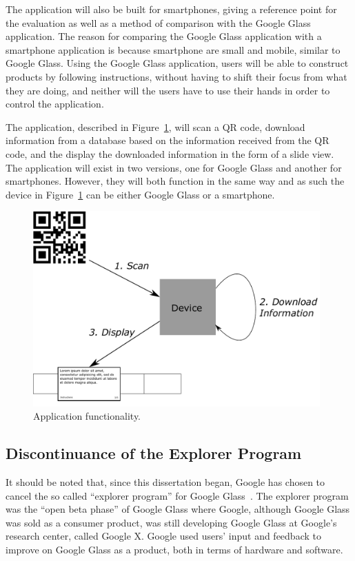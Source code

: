 The application will also be built for smartphones, giving a reference point for the evaluation as well as a method of comparison with the Google Glass application. The reason for comparing the Google Glass application with a smartphone application is because smartphone are small and mobile, similar to Google Glass. Using the Google Glass application, users will be able to construct products by following instructions, without having to shift their focus from what they are doing, and neither will the users have to use their hands in order to control the application.

The application, described in Figure~\ref{projectmapLightVersion}, will scan a QR code, download information from a database based on the information received from the QR code, and the display the downloaded information in the form of a slide view. The application will exist in two versions, one for Google Glass and another for smartphones. However, they will both function in the same way and as such the device in Figure~\ref{projectmapLightVersion} can be either Google Glass or a smartphone.

	\begin{figure}[ht!]
		\centering
		\includegraphics[width=110mm]{images/projectmapLightVersion}
		\caption{Application functionality.}
		\label{projectmapLightVersion}
	\end{figure}

\subsection{Discontinuance of the Explorer Program}
It should be noted that, since this dissertation began, Google has chosen to cancel the so called ``explorer program'' for Google Glass~\cite{glassDiscontinued}. The explorer program was the ``open beta phase'' of Google Glass where Google, although Google Glass was sold as a consumer product, was still developing Google Glass at Google's research center, called Google X. Google used users' input and feedback to improve on Google Glass as a product, both in terms of hardware and software.

